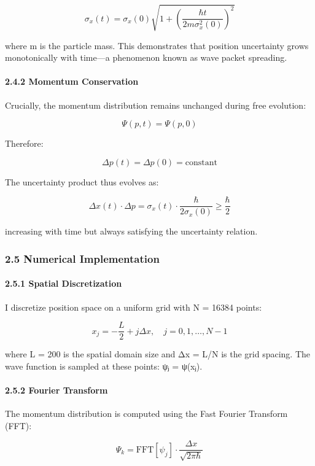 \documentclass[
]{article}
\begin{document}
\[\sigma_x(t) = \sigma_x(0)\sqrt{1 + \left(\frac{\hbar t}{2m\sigma_x^2(0)}\right)^2}\]

where m is the particle mass. This demonstrates that position
uncertainty grows monotonically with time---a phenomenon known as wave
packet spreading.

\paragraph{2.4.2 Momentum Conservation}\label{momentum-conservation}

Crucially, the momentum distribution remains unchanged during free
evolution:

\[\Psi(p,t) = \Psi(p,0)\]

Therefore:

\[\Delta p(t) = \Delta p(0) = \text{constant}\]

The uncertainty product thus evolves as:

\[\Delta x(t) \cdot \Delta p = \sigma_x(t) \cdot \frac{\hbar}{2\sigma_x(0)} \geq \frac{\hbar}{2}\]

increasing with time but always satisfying the uncertainty relation.

\subsubsection{2.5 Numerical
Implementation}\label{numerical-implementation}

\paragraph{2.5.1 Spatial Discretization}\label{spatial-discretization}

I discretize position space on a uniform grid with N = 16384 points:

\[x_j = -\frac{L}{2} + j\Delta x, \quad j = 0,1,\ldots,N-1\]

where L = 200 is the spatial domain size and Δx = L/N is the grid
spacing. The wave function is sampled at these points: ψⱼ = ψ(xⱼ).

\paragraph{2.5.2 Fourier Transform}\label{fourier-transform}

The momentum distribution is computed using the Fast Fourier Transform
(FFT):

\[\Psi_k = \text{FFT}[\psi_j] \cdot \frac{\Delta x}{\sqrt{2\pi\hbar}}\]
\end{document}
